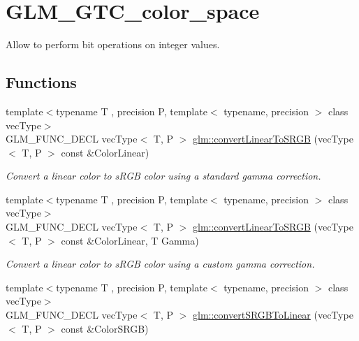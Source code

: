 \hypertarget{group__gtc__color__space}{\section{G\-L\-M\-\_\-\-G\-T\-C\-\_\-color\-\_\-space}
\label{group__gtc__color__space}
}


Allow to perform bit operations on integer values.  


\subsection*{Functions}
\begin{DoxyCompactItemize}
\item 
\hypertarget{group__gtc__color__space_gad813dcd99644cafc775e83d6504ccb93}{{\footnotesize template$<$typename T , precision P, template$<$ typename, precision $>$ class vec\-Type$>$ }\\G\-L\-M\-\_\-\-F\-U\-N\-C\-\_\-\-D\-E\-C\-L vec\-Type$<$ T, P $>$ \hyperlink{group__gtc__color__space_gad813dcd99644cafc775e83d6504ccb93}{glm\-::convert\-Linear\-To\-S\-R\-G\-B} (vec\-Type$<$ T, P $>$ const \&Color\-Linear)}\label{group__gtc__color__space_gad813dcd99644cafc775e83d6504ccb93}

\begin{DoxyCompactList}\small\item\em Convert a linear color to s\-R\-G\-B color using a standard gamma correction. \end{DoxyCompactList}\item 
\hypertarget{group__gtc__color__space_ga63f8b003da7acf44370eb47bfb8b3d42}{{\footnotesize template$<$typename T , precision P, template$<$ typename, precision $>$ class vec\-Type$>$ }\\G\-L\-M\-\_\-\-F\-U\-N\-C\-\_\-\-D\-E\-C\-L vec\-Type$<$ T, P $>$ \hyperlink{group__gtc__color__space_ga63f8b003da7acf44370eb47bfb8b3d42}{glm\-::convert\-Linear\-To\-S\-R\-G\-B} (vec\-Type$<$ T, P $>$ const \&Color\-Linear, T Gamma)}\label{group__gtc__color__space_ga63f8b003da7acf44370eb47bfb8b3d42}

\begin{DoxyCompactList}\small\item\em Convert a linear color to s\-R\-G\-B color using a custom gamma correction. \end{DoxyCompactList}\item 
\hypertarget{group__gtc__color__space_ga28e98e64347cf385cadc1ceb4def55c9}{{\footnotesize template$<$typename T , precision P, template$<$ typename, precision $>$ class vec\-Type$>$ }\\G\-L\-M\-\_\-\-F\-U\-N\-C\-\_\-\-D\-E\-C\-L vec\-Type$<$ T, P $>$ \hyperlink{group__gtc__color__space_ga28e98e64347cf385cadc1ceb4def55c9}{glm\-::convert\-S\-R\-G\-B\-To\-Linear} (vec\-Type$<$ T, P $>$ const \&Color\-S\-R\-G\-B)}\label{group__gtc__color__space_ga28e98e64347cf385cadc1ceb4def55c9}


\end{DoxyCompactItemize}
